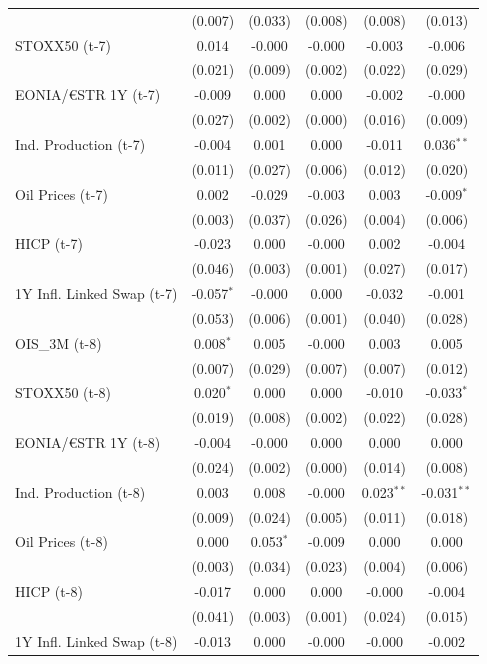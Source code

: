 \begin{longtable}[t]{lccccc}
 & (0.007) & (0.033) & (0.008) & (0.008) & (0.013)\\
STOXX50 (t-7) & 0.014 & -0.000 & -0.000 & -0.003 & -0.006\\
 & (0.021) & (0.009) & (0.002) & (0.022) & (0.029)\\
EONIA/€STR 1Y (t-7) & -0.009 & 0.000 & 0.000 & -0.002 & -0.000\\
 & (0.027) & (0.002) & (0.000) & (0.016) & (0.009)\\
Ind. Production (t-7) & -0.004 & 0.001 & 0.000 & -0.011 & 0.036$^{**}$\\
 & (0.011) & (0.027) & (0.006) & (0.012) & (0.020)\\
Oil Prices (t-7) & 0.002 & -0.029 & -0.003 & 0.003 & -0.009$^{*}$\\
 & (0.003) & (0.037) & (0.026) & (0.004) & (0.006)\\
HICP (t-7) & -0.023 & 0.000 & -0.000 & 0.002 & -0.004\\
 & (0.046) & (0.003) & (0.001) & (0.027) & (0.017)\\
1Y Infl. Linked Swap (t-7) & -0.057$^{*}$ & -0.000 & 0.000 & -0.032 & -0.001\\
 & (0.053) & (0.006) & (0.001) & (0.040) & (0.028)\\
OIS\_3M (t-8) & 0.008$^{*}$ & 0.005 & -0.000 & 0.003 & 0.005\\
 & (0.007) & (0.029) & (0.007) & (0.007) & (0.012)\\
STOXX50 (t-8) & 0.020$^{*}$ & 0.000 & 0.000 & -0.010 & -0.033$^{*}$\\
 & (0.019) & (0.008) & (0.002) & (0.022) & (0.028)\\
EONIA/€STR 1Y (t-8) & -0.004 & -0.000 & 0.000 & 0.000 & 0.000\\
 & (0.024) & (0.002) & (0.000) & (0.014) & (0.008)\\
Ind. Production (t-8) & 0.003 & 0.008 & -0.000 & 0.023$^{**}$ & -0.031$^{**}$\\
 & (0.009) & (0.024) & (0.005) & (0.011) & (0.018)\\
Oil Prices (t-8) & 0.000 & 0.053$^{*}$ & -0.009 & 0.000 & 0.000\\
 & (0.003) & (0.034) & (0.023) & (0.004) & (0.006)\\
HICP (t-8) & -0.017 & 0.000 & 0.000 & -0.000 & -0.004\\
 & (0.041) & (0.003) & (0.001) & (0.024) & (0.015)\\
1Y Infl. Linked Swap (t-8) & -0.013 & 0.000 & -0.000 & -0.000 & -0.002\\

\end{longtable}
